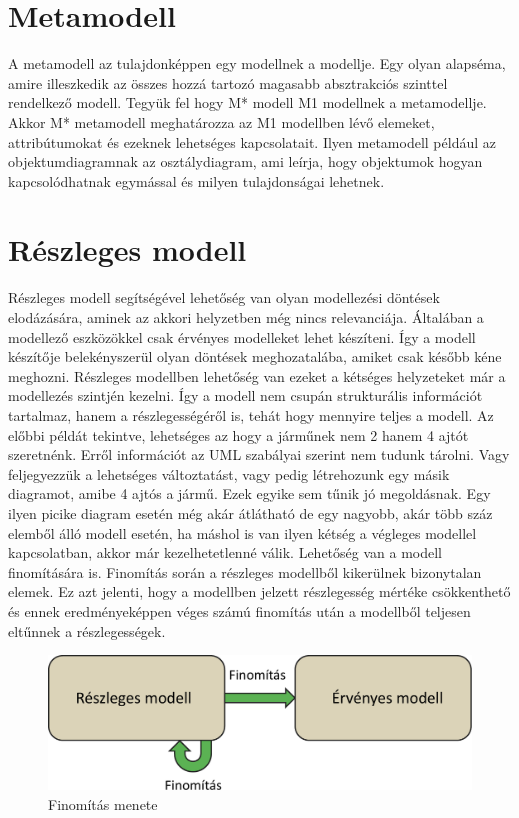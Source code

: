 \section{Metamodell}
A metamodell az tulajdonképpen egy modellnek a modellje. Egy olyan alapséma, amire illeszkedik az összes hozzá tartozó magasabb absztrakciós szinttel rendelkező modell. 
Tegyük fel hogy M* modell M1 modellnek a metamodellje.
Akkor M* metamodell meghatározza az M1 modellben lévő elemeket, attribútumokat és ezeknek lehetséges kapcsolatait. Ilyen metamodell például az objektumdiagramnak az osztálydiagram, ami leírja, hogy objektumok hogyan kapcsolódhatnak egymással és milyen tulajdonságai lehetnek. 
\section{Részleges modell}
Részleges modell segítségével lehetőség van olyan modellezési döntések elodázására, aminek az akkori helyzetben még nincs relevanciája. Általában a modellező eszközökkel csak érvényes modelleket lehet készíteni. Így a modell készítője belekényszerül olyan döntések meghozatalába, amiket csak később kéne meghozni. Részleges modellben lehetőség van ezeket a kétséges helyzeteket már a modellezés szintjén kezelni. Így a modell nem csupán strukturális információt tartalmaz, hanem a részlegességéről is, tehát hogy mennyire teljes a modell. Az előbbi példát tekintve, lehetséges az hogy a járműnek nem 2 hanem 4 ajtót szeretnénk. Erről információt az UML szabályai szerint nem tudunk tárolni. Vagy feljegyezzük a lehetséges változtatást, vagy pedig létrehozunk egy másik diagramot, amibe 4 ajtós a jármű. Ezek egyike sem tűnik jó megoldásnak. Egy ilyen picike diagram esetén még akár átlátható de egy nagyobb, akár több száz elemből álló modell esetén, ha máshol is van ilyen kétség a végleges modellel kapcsolatban, akkor már kezelhetetlenné válik.
Lehetőség van a modell finomítására is. Finomítás során a részleges modellből kikerülnek bizonytalan elemek. Ez azt jelenti, hogy a modellben jelzett részlegesség mértéke csökkenthető és ennek eredményeképpen véges számú finomítás után a modellből teljesen eltűnnek a részlegességek.


\begin{figure}[!ht]
	\centering
	\includegraphics[width=120mm]{figures/finom.pdf}
	\caption{Finomítás menete} 
\end{figure}

